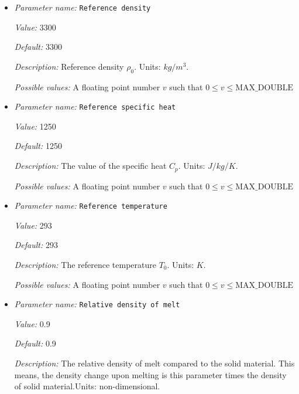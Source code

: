 \begin{itemize}
{\it Possible values:} A floating point number $v$ such that $-\text{MAX\_DOUBLE} \leq v \leq \text{MAX\_DOUBLE}$
\item {\it Parameter name:} {\tt Reference density}
\label{parameters:Material model/Latent heat melt/Reference density}


{\it Value:} 3300


{\it Default:} 3300


{\it Description:} Reference density $\rho_0$. Units: $kg/m^3$.


{\it Possible values:} A floating point number $v$ such that $0 \leq v \leq \text{MAX\_DOUBLE}$
\item {\it Parameter name:} {\tt Reference specific heat}
\label{parameters:Material model/Latent heat melt/Reference specific heat}


{\it Value:} 1250


{\it Default:} 1250


{\it Description:} The value of the specific heat $C_p$. Units: $J/kg/K$.


{\it Possible values:} A floating point number $v$ such that $0 \leq v \leq \text{MAX\_DOUBLE}$
\item {\it Parameter name:} {\tt Reference temperature}
\label{parameters:Material model/Latent heat melt/Reference temperature}


{\it Value:} 293


{\it Default:} 293


{\it Description:} The reference temperature $T_0$. Units: $K$.


{\it Possible values:} A floating point number $v$ such that $0 \leq v \leq \text{MAX\_DOUBLE}$
\item {\it Parameter name:} {\tt Relative density of melt}
\label{parameters:Material model/Latent heat melt/Relative density of melt}


{\it Value:} 0.9


{\it Default:} 0.9


{\it Description:} The relative density of melt compared to the solid material. This means, the density change upon melting is this parameter times the density of solid material.Units: non-dimensional.



\end{itemize}
